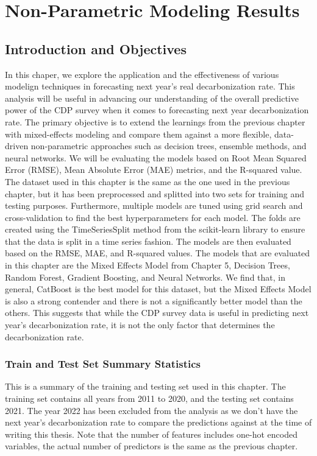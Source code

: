 \chapter{Non-Parametric Modeling Results}

\section{Introduction and Objectives}
In this chaper, we explore the application and the effectiveness of various modelign techniques in forecasting next year's real decarbonization rate. This analysis will be useful in advancing our understanding of the overall predictive power of the CDP survey when it comes to forecasting next year decarbonization rate. The primary objective is to extend the learnings from the previous chapter with mixed-effects modeling and compare them against a more flexible, data-driven non-parametric approaches such as decision trees, ensemble methods, and neural networks. We will be evaluating the models based on Root Mean Squared Error (RMSE), Mean Absolute Error (MAE) metrics, and the R-squared value. The dataset used in this chapter is the same as the one used in the previous chapter, but it has been preprocessed and splitted into two sets for training and testing purposes. Furthermore, multiple models are tuned using grid search and cross-validation to find the best hyperparameters for each model. The folds are created using the TimeSeriesSplit method from the scikit-learn library to ensure that the data is split in a time series fashion. The models are then evaluated based on the RMSE, MAE, and R-squared values. The models that are evaluated in this chapter are the Mixed Effects Model from Chapter 5,  Decision Trees, Random Forest, Gradient Boosting, and Neural Networks. We find that, in general, CatBoost is the best model for this dataset, but the Mixed Effects Model is also a strong contender and there is not a significantly better model than the others. This suggests that while the CDP survey data is useful in predicting next year's decarbonization rate, it is not the only factor that determines the decarbonization rate.

\subsection{Train and Test Set Summary Statistics}
This is a summary of the training and testing set used in this chapter. The training set contains all years from 2011 to 2020, and the testing set contains 2021. The year 2022 has been excluded from the analysis as we don't have the next year's decarbonization rate to compare the predictions against at the time of writing this thesis. Note that the number of features includes one-hot encoded variables, the actual number of predictors is the same as the previous chapter.

